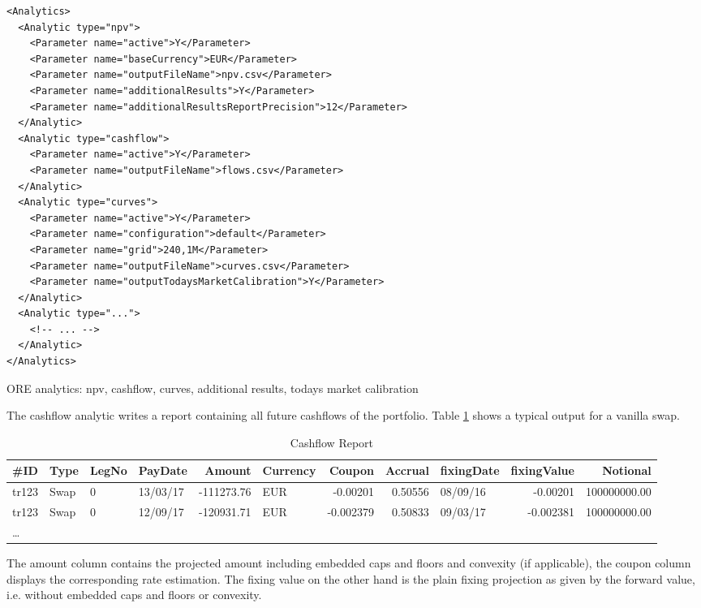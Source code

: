 {\begin{listing}[H]
\begin{verbatim}
<Analytics>    
  <Analytic type="npv">
    <Parameter name="active">Y</Parameter>
    <Parameter name="baseCurrency">EUR</Parameter>
    <Parameter name="outputFileName">npv.csv</Parameter>
    <Parameter name="additionalResults">Y</Parameter>
    <Parameter name="additionalResultsReportPrecision">12</Parameter>
  </Analytic>      
  <Analytic type="cashflow">
    <Parameter name="active">Y</Parameter>
    <Parameter name="outputFileName">flows.csv</Parameter>
  </Analytic>      
  <Analytic type="curves">
    <Parameter name="active">Y</Parameter>
    <Parameter name="configuration">default</Parameter>
    <Parameter name="grid">240,1M</Parameter>
    <Parameter name="outputFileName">curves.csv</Parameter>
    <Parameter name="outputTodaysMarketCalibration">Y</Parameter>
  </Analytic>
  <Analytic type="...">
    <!-- ... -->
  </Analytic>      
</Analytics>      
\end{verbatim}
\caption{ORE analytics: npv, cashflow, curves, additional results, todays market calibration}
\label{lst:ore_analytics}
\end{listing}

The cashflow analytic writes a report containing all future cashflows of the portfolio. Table \ref{cashflowreport} shows
a typical output for a vanilla swap.

\begin{table}[hbt]
\scriptsize
\begin{center}
  \begin{tabular}{l|l|l|l|r|l|r|r|l|r|r}
\hline
\#ID & Type & LegNo & PayDate & Amount & Currency & Coupon & Accrual & fixingDate & fixingValue & Notional \\
\hline
\hline
tr123 & Swap & 0 & 13/03/17 & -111273.76 & EUR & -0.00201 & 0.50556 & 08/09/16 & -0.00201 & 100000000.00 \\
tr123 & Swap & 0 & 12/09/17 & -120931.71 & EUR & -0.002379 & 0.50833 & 09/03/17 & -0.002381 & 100000000.00 \\
\ldots
\end{tabular}
\caption{Cashflow Report}
\label{cashflowreport}
\end{center}
\end{table}

The amount column contains the projected amount including embedded caps and floors and convexity (if applicable), the
coupon column displays the corresponding rate estimation. The fixing value on the other hand is the plain fixing
projection as given by the forward value, i.e. without embedded caps and floors or convexity.

}
